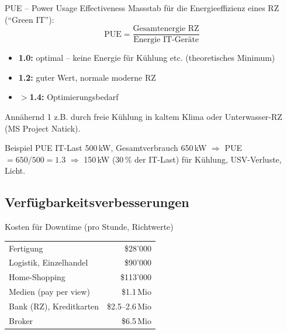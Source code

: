 \documentclass[a4paper, fontsize=7pt]{scrartcl}
\renewcommand*{\arraystretch}{1.5}  %
\begin{document}
\begin{mainbox}{PUE -- Power Usage Effectiveness}
Massstab für die Energieeffizienz eines RZ (``Green IT''):
$$\boxed{\text{PUE} = \frac{\text{Gesamtenergie RZ}}{\text{Energie IT-Geräte}}}$$
\begin{itemize}
    \item \textbf{1.0:} optimal -- keine Energie für Kühlung etc.
          (theoretisches Minimum)
    \item \textbf{1.2:} guter Wert, normale moderne RZ
    \item \textbf{$>$1.4:} Optimierungsbedarf
\end{itemize}
Annähernd 1 z.B. durch freie Kühlung in kaltem Klima oder Unterwasser-RZ
(MS Project Natick).
\end{mainbox}

\begin{subbox}{Beispiel PUE}
IT-Last 500\,kW, Gesamtverbrauch 650\,kW
$\Rightarrow$ PUE $= 650/500 = 1.3$
$\Rightarrow$ 150\,kW (30\,\% der IT-Last) für Kühlung, USV-Verluste, Licht.
\end{subbox}

\subsection{Verfügbarkeitsverbesserungen}

\begin{subbox}{Kosten für Downtime (pro Stunde, Richtwerte)}
\renewcommand*{\arraystretch}{1.1}
\begin{tabularx}{\linewidth}{@{}X r@{}}
Fertigung & \$28'000 \\
Logistik, Einzelhandel & \$90'000 \\
Home-Shopping & \$113'000 \\
Medien (pay per view) & \$1.1\,Mio \\
Bank (RZ), Kreditkarten & \$2.5--2.6\,Mio \\
Broker & \$6.5\,Mio \\
\end{tabularx}
\end{subbox}
\end{document}
